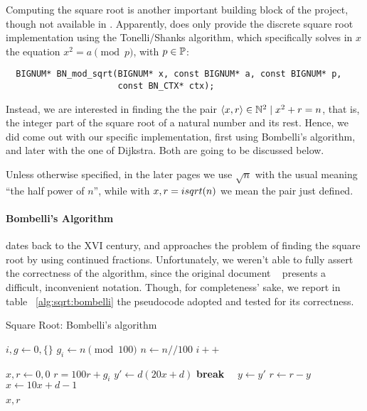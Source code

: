 Computing the square root is another important building block of the project,
though not available in \openssl\!.
Apparently,
\openssl does only provide the discrete square root implementation using the
Tonelli/Shanks algorithm, which specifically solves in $x$ the equation
$x^2 = a \pmod{p}$, with $p \in \mathbb{P}$:

\begin{verbatim}
  BIGNUM* BN_mod_sqrt(BIGNUM* x, const BIGNUM* a, const BIGNUM* p,
                      const BN_CTX* ctx);
\end{verbatim}

Instead, we are interested in finding the the pair
$\langle x, r\rangle \in \mathbb{N}^2 \mid x^2 + r = n$, that is, the integer part of
the square root of a natural number and its rest.
Hence, we did come out with our specific implementation, first using Bombelli's
algorithm, and later with the one of Dijkstra. Both are going to be discussed
below.

Unless otherwise specified, in the later pages we use $\sqrt{n}$ with the
usual meaning ``the half power of $n$'', while with $x, r = isqrt(n)$ we mean
the pair just defined.

\paragraph{Bombelli's Algorithm \label{par:preq:sqrt:bombelli}} dates back to
the XVI century, and approaches the problem of finding the square root by using
continued fractions. Unfortunately, we weren't able to fully assert the
correctness of the algorithm, since the original document
~\cite{bombelli:algebra} presents a difficult, inconvenient notation. Though,
for completeness' sake, we report in table
~\ref{alg:sqrt:bombelli} the pseudocode adopted and tested for its correctness.

\begin{algorithm}[H]
  \caption{Square Root: Bombelli's algorithm}
  \label{alg:sqrt:bombelli}
  \begin{algorithmic}[1]

    \State $i, g \gets 0, \{\}$
      \State $g_i \gets n \pmod{100}$
      \State $n \gets n // 100$
      \State $i++$
    \EndWhile

    \State $x, r \gets 0, 0$
      \State $r = 100r + g_i$
        \State $y' \gets d(20x + d)$
          \textbf{break}
        \Else  \ \ $y \gets y'$
        \EndIf
      \EndFor
      \State $r \gets r - y$
      \State $x \gets 10x + d - 1$
    \EndFor

    \State \Return $x, r$

    \EndProcedure
  \end{algorithmic}
\end{algorithm}

